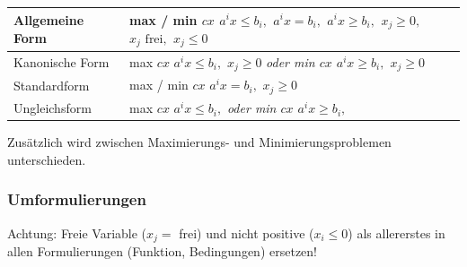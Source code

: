     \begin{tabularx}{\textwidth}{|l|X|}
      \hline
      Allgemeine Form & 
          max / min $cx$ \newline
          $a^ix \leq b_i,$ \newline
          $a^ix = b_i,$ \newline
          $a^ix \geq b_i,$ \newline
          $x_j \geq 0,$ \newline
          $x_j \text{ frei},$ \newline
          $x_j \leq 0$
          \\
      \hline
      Kanonische Form & 
          max $cx$ \newline
          $a^ix \leq b_i,$ \newline
          $x_j \geq 0$ \newline
          \em oder \em\newline
          min $cx$ \newline
          $a^ix \geq b_i,$ \newline
          $x_j \geq 0$
         \\
      \hline
      Standardform & 
        max / min $cx$ \newline
        $a^ix = b_i,$ \newline
        $x_j \geq 0$
        \\
      \hline
      Ungleichsform & 
        max $cx$ \newline
        $a^ix \leq b_i,$ \newline
        \em oder \em \newline
        min $cx$ \newline
        $a^ix \geq b_i,$
        \\
      \hline
    \end{tabularx}

    Zusätzlich wird zwischen Maximierungs- und Minimierungsproblemen unterschieden.
    
  \subsubsection{Umformulierungen }
   	Achtung: Freie Variable ($x_j = $ frei) und nicht positive ($x_i \leq 0$) als allererstes in allen Formulierungen (Funktion, Bedingungen) ersetzen!
    	
